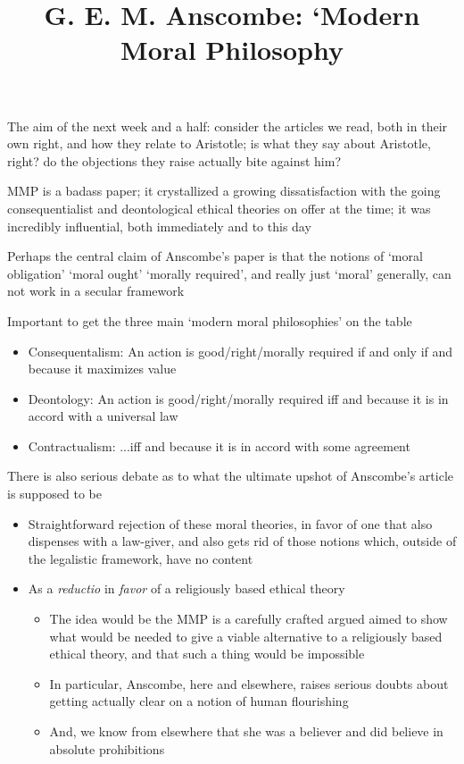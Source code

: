 \documentclass[11pt]{article}
\title{G. E. M. Anscombe: `Modern Moral Philosophy}
\author{}
\date{}
\begin{document}
\maketitle

\noindent The aim of the next week and a half: consider the articles we read, both in their own right, and how they relate to Aristotle; is what they say about Aristotle, right? do the objections they raise actually bite against him?
\vspace*{2mm}

\noindent MMP is a badass paper; it crystallized a growing dissatisfaction with the going consequentialist and deontological ethical theories on offer at the time; it was incredibly influential, both immediately and to this day
\vspace*{2mm}

\noindent Perhaps the central claim of Anscombe's paper is that the notions of `moral obligation' `moral ought' `morally required', and really just `moral' generally, can not work in a secular framework
\vspace*{2mm}

\noindent Important to get the three main `modern moral philosophies' on the table

\begin{itemize}\item{Consequentalism: An action is good/right/morally required if and only if and because it maximizes value}\item{Deontology: An action is good/right/morally required iff and because it is in accord with a universal law}\item{Contractualism: ...iff and because it is in accord with some agreement}\end{itemize}

\noindent There is also serious debate as to what the ultimate upshot of Anscombe's article is supposed to be

\begin{itemize}\item{Straightforward rejection of these moral theories, in favor of one that also dispenses with a law-giver, and also gets rid of those notions which, outside of the legalistic framework, have no content}\item{As a \emph{reductio} in \emph{favor} of a religiously based ethical theory}\begin{itemize}\item{The idea would be the MMP is a carefully crafted argued aimed to show what would be needed to give a viable alternative to a religiously based ethical theory, and that such a thing would be impossible}\item{In particular, Anscombe, here and elsewhere, raises serious doubts about getting actually clear on a notion of human flourishing}\item{And, we know from elsewhere that she was a believer and did believe in absolute prohibitions}\end{itemize}\end{itemize}
\end{document}
